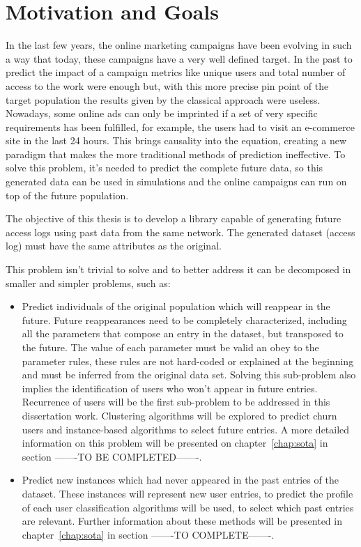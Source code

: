 \section{Motivation and Goals} \label{sec:goals}

In the last few years, the online marketing campaigns have been evolving in such a way that today, these campaigns have a very well defined target.
In the past to predict the impact of a campaign metrics like unique users and total number of access to the work were enough but, with this more precise pin point 
of the target population the results given by the classical approach were useless.
Nowadays, some online ads can only be imprinted if a set of very specific requirements has been fulfilled, for example,
the users had to visit an e-commerce site in the last 24 hours. This brings causality into the equation, creating a new paradigm that makes 
the more traditional methods of prediction ineffective. To solve this problem, it's needed to predict the complete future data, so this generated data
can be used in simulations and the online campaigns can run on top of the future population.

The objective of this thesis is to develop a library capable of generating future access logs using past data from the same network.
The generated dataset (access log) must have the same attributes as the original.

This problem isn't trivial to solve and to better address it can be decomposed in smaller and simpler problems, such as:
\begin{itemize}
    \item Predict individuals of the original population which will reappear in the future. Future reappearances need to be completely characterized, including 
      all the parameters that compose an entry in the dataset, but transposed to the future. The value of each parameter must be valid an obey to the parameter
      rules, these rules are not hard-coded or explained at the beginning and must be inferred from the original data set. Solving this sub-problem also implies the identification
      of users who won't appear in future entries. Recurrence of users will be the first sub-problem to be addressed in this dissertation work. 
      Clustering algorithms will be explored to predict churn users and instance-based algorithms to select future entries. A more detailed information
      on this problem will be presented on chapter~\ref{chap:sota} in section -------TO BE COMPLETED-------.
    \item Predict new instances which had never appeared in the past entries of the dataset.
      These instances will represent new user entries, to predict the profile of each user classification algorithms will be used, to select 
      which past entries are relevant. Further information about these methods will be presented in
      chapter~\ref{chap:sota} in section -------TO COMPLETE-------.
\end{itemize}

